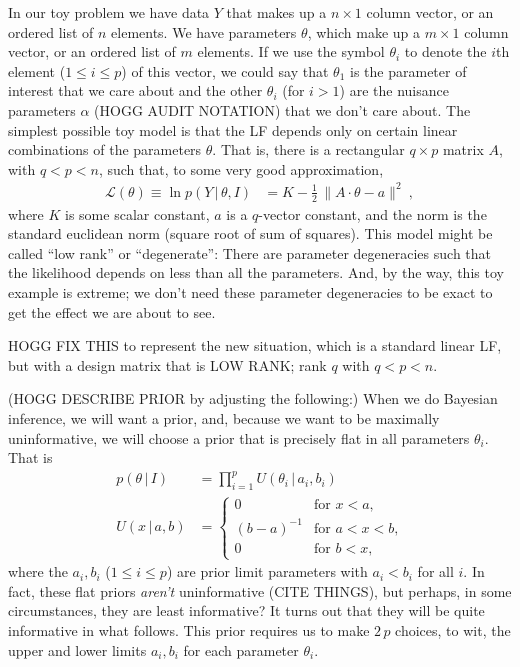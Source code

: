 \documentclass{article}
\newcommand{\given}{\,|\,}
\newcommand{\norm}[1]{\lVert{#1}\rVert}
\begin{document}
In our toy problem we have data $Y$ that makes up a $n\times 1$ column vector, or an ordered list of $n$ elements.
We have parameters $\theta$, which make up a $m\times 1$ column vector, or an ordered list of $m$ elements.
If we use the symbol $\theta_i$ to denote the $i$th element ($1\leq i\leq p$) of this vector, we could say that $\theta_1$ is the parameter of interest that we care about and the other $\theta_i$ (for $i>1$) are the nuisance parameters $\alpha$ (HOGG AUDIT NOTATION) that we don't care about.
The simplest possible toy model is that the LF depends only on certain linear combinations of the parameters $\theta$.
That is, there is a rectangular $q\times p$ matrix $A$, with $q<p<n$, such that, to some very good approximation,
\begin{align}
    \mathscr{L}(\theta) \equiv \ln p(Y\given\theta,I) &= K - \frac{1}{2}\,\norm{A\cdot\theta - a}^2 ~,\label{eq:toyLF}
\end{align}
where $K$ is some scalar constant, $a$ is a $q$-vector constant, and the norm is the standard euclidean norm (square root of sum of squares).
This model might be called ``low rank'' or ``degenerate'':
There are parameter degeneracies such that the likelihood depends on less than all the parameters.
And, by the way, this toy example is extreme; we don't need these parameter degeneracies to be exact to get the effect we are about to see.

HOGG FIX THIS to represent the new situation, which is a standard linear LF, but with a design matrix that is LOW RANK; rank $q$ with $q<p<n$.

(HOGG DESCRIBE PRIOR by adjusting the following:)
When we do Bayesian inference, we will want a prior, and, because we want to be maximally uninformative, we will choose a prior that is precisely flat in all parameters $\theta_i$.
That is
\begin{align}
    p(\theta\given I) &= \prod_{i=1}^p U(\theta_i\given a_i, b_i) \\
    U(x\given a, b) & = \left\{\begin{array}{cl}
    0 & \mbox{for $x<a$,} \\
    (b-a)^{-1} & \mbox{for $a<x<b$,} \\
    0 & \mbox{for $b<x$,}\end{array}\right.
\end{align}
where the $a_i, b_i$ ($1\leq i\leq p$) are prior limit parameters with $a_i<b_i$ for all $i$.
In fact, these flat priors \emph{aren't} uninformative (CITE THINGS), but perhaps, in some circumstances, they are least informative?
It turns out that they will be quite informative in what follows.
This prior requires us to make $2\,p$ choices, to wit, the upper and lower limits $a_i, b_i$ for each parameter $\theta_i$.
\end{document}
